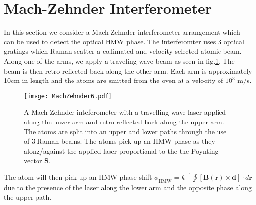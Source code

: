 \documentclass[twocolumn,english,pra,aps,superscriptaddress,floatfix]{revtex4-1}
\begin{document}
\section{Mach-Zehnder Interferometer}
\label{sec:mach}
In this section we consider a Mach-Zehnder interferometer arrangement which can be used to detect the optical HMW phase.  The interferomter uses 3 optical gratings which Raman scatter a collimated and velocity selected atomic beam.  Along one of the arms, we apply a traveling wave beam as seen in fig.\ref{fig:mach}. The beam is then retro-reflected back along the other arm. Each arm is approximately 10cm in length and the atoms are emitted from the oven at a velocity of $10^3$ m/s. 
\begin{figure}
\texttt{[image: MachZehnder6.pdf]}
\caption{A Mach-Zehnder inteferometer with a travelling wave laser applied along the lower arm and retro-reflected back along the upper arm.  The atoms are split into an upper and lower paths through the use of 3 Raman beams.  The atoms pick up an HMW phase as they along/against the applied laser proportional to the the Poynting vector $\mathbf{S}$.} 
\label{fig:mach}
\end{figure}
The atom will then pick up an HMW phase shift $ \phi_{\mathrm{HMW}} = \hbar^{-1} \oint [\mathbf{B}(\mathbf{r}) \times \mathbf {d}] \cdot d \mathbf r $ due to the presence of the laser along the lower arm and the opposite phase along the upper path.  
\end{document}
